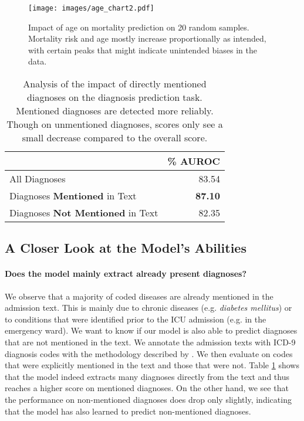 \documentclass[11pt,a4paper]{article}
\begin{document}
\begin{figure}
\centering
  \texttt{[image: images/age\_chart2.pdf]}
  \caption{Impact of age on mortality prediction on 20 random samples. Mortality risk and age mostly increase proportionally as intended, with certain peaks that might indicate unintended biases in the data.}
\label{fig:age}
\end{figure}

\begin{table}[t!]
\begin{tabular}{@{}lr@{}}
\hline
 & \% AUROC\\ \hline
All Diagnoses & 83.54 \\
Diagnoses \textbf{Mentioned} in Text & \textbf{87.10} \\
Diagnoses \textbf{Not Mentioned} in Text & 82.35 \\\hline

\end{tabular}
\caption{Analysis of the impact of directly mentioned diagnoses on the diagnosis prediction task. Mentioned diagnoses are detected more reliably. Though on unmentioned diagnoses, scores only see a small decrease compared to the overall score.}
\label{table:extract_results}
\end{table}

\subsection{A Closer Look at the Model's Abilities}

\paragraph{Does the model mainly extract already present diagnoses?} We observe that a majority of coded diseases are already mentioned in the admission text. This is mainly due to chronic diseases (e.g. \textit{diabetes mellitus}) or to conditions that were identified prior to the ICU admission (e.g. in the emergency ward). We want to know if our model is also able to predict diagnoses that are not mentioned in the text. We annotate the admission texts with ICD-9 diagnosis codes with the methodology described by \citet{silver_mimic}. We then evaluate on codes that were explicitly mentioned in the text and those that were not. Table \ref{table:extract_results} shows that the model indeed extracts many diagnoses directly from the text and thus reaches a higher score on mentioned diagnoses. On the other hand, we see that the performance on non-mentioned diagnoses does drop only slightly, indicating that the model has also learned to predict non-mentioned diagnoses.
\end{document}
